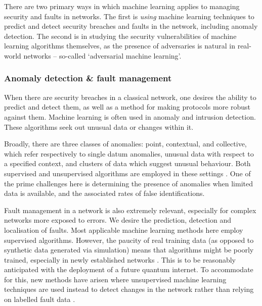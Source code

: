 \documentclass[twocolumn, aps, rmp, amsmath, amssymb, nofootinbib, superscriptaddress, longbibliography, floatfix, table-of-contents, eqsecnum]{revtex4}
\begin{document}
There are two primary ways in which machine learning applies to managing security and faults in networks. The first is \textit{using} machine learning techniques to predict and detect security breaches and faults in the network, including anomaly detection. The second is in studying the security vulnerabilities of machine learning algorithms themselves, as the presence of adversaries is natural in real-world networks -- so-called `adversarial machine learning'.

\subsubsection{Anomaly detection \& fault management}

When there are security breaches in a classical network, one desires the ability to predict and detect them, as well as a method for making protocols more robust against them. Machine learning is often used in anomaly and intrusion detection. These algorithms seek out unusual data or changes within it.

Broadly, there are three classes of anomalies: point, contextual, and collective, which refer respectively to single datum anomalies, unusual data with respect to a specified context, and clusters of data which suggest unusual behaviour. Both supervised and unsupervised algorithms are employed in these settings \cite{bib:thottan2003anomaly, bib:ahmed2007machine}. One of the prime challenges here is determining the presence of anomalies when limited data is available, and the associated rates of false identifications.

Fault management in a network is also extremely relevant, especially for complex networks more exposed to errors. We desire the prediction, detection and localisation of faults. Most applicable machine learning methods here employ supervised algorithms. However, the paucity of real training data (as opposed to synthetic data generated via simulation) means that algorithms might be poorly trained, especially in newly established networks \cite{bib:hood1997proactive, bib:kogeda2006prediction, bib:snow2005assessing}. This is to be reasonably anticipated with the deployment of a future quantum internet. To accommodate for this, new methods have arisen where unsupervised machine learning techniques are used instead to detect changes in the network rather than relying on labelled fault data \cite{bib:hajji2005statistical}.
\end{document}
